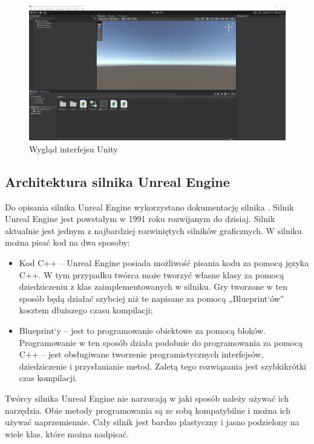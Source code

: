 \documentclass[12pt,twoside]{article}
\begin{document}
\begin{figure}[H]
    \centering
    \includegraphics[width=16cm]{figures/InterfejsUnity.png}
    \caption{Wygląd interfejsu Unity}
    \label{Fig:UnityInterface}
\end{figure}  


\subsection{Architektura silnika Unreal Engine}
Do opisania silnika Unreal Engine wykorzystano dokumentację silnika \cite{UE:Documentatnion}.
Silnik Unreal Engine jest powstałym w 1991 roku rozwijanym do dzisiaj. Silnik
aktualnie jest jednym z najbardziej rozwiniętych silników graficznych. W silniku
można pisać kod na dwa sposoby: 
\begin{itemize}
\item Kod C++ -- Unreal Engine posiada możliwość pisania kodu za pomocą języka
C++. W tym przypadku twórca może tworzyć własne klasy za pomocą dziedziczeniu z
klas zaimplementowanych w silniku. Gry tworzone w ten sposób będą działać
szybciej niż te napisane za pomocą „Blueprint`ów” kosztem dłuższego czasu
kompilacji; 
\item Blueprint`y -- jest to programowanie obiektowe za pomocą bloków.
Programowanie w ten sposób działa podobnie do programowania za pomocą C++ -- jest
obsługiwane tworzenie programistycznych interfejsów, dziedziczenie i
przysłanianie metod. Zaletą tego rozwiązania jest szybkikrótki czas kompilacji.
\end{itemize}

Twórcy silnika Unreal Engine nie narzucają w jaki sposób należy używać ich
narzędzia. Obie metody programowania są ze sobą kompatybilne i można ich używać
naprzemiennie. Cały silnik jest bardzo plastyczny i jasno podzielony na wiele
klas, które można nadpisać\cite{UnrealEngineArchitecture}. 
\end{document}
